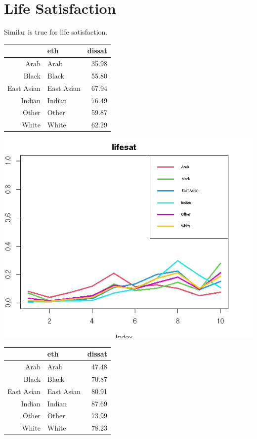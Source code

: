 \documentclass{amsart}
\begin{document}
\section{Life Satisfaction}

Similar is true for life satisfaction.
\begin{table}[ht]
\centering
\begin{tabular}{rlr}
  \hline
 & eth & dissat \\ 
  \hline
Arab & Arab & 35.98 \\ 
  Black & Black & 55.80 \\ 
  East Asian & East Asian & 67.94 \\ 
  Indian & Indian & 76.49 \\ 
  Other & Other & 59.87 \\ 
  White & White & 62.29 \\ 
   \hline
\end{tabular}
\end{table}


\includegraphics[scale=0.6]{lifesat.jpeg}


\begin{table}[ht]
\centering
\begin{tabular}{rlr}
  \hline
 & eth & dissat \\ 
  \hline
Arab & Arab & 47.48 \\ 
  Black & Black & 70.87 \\ 
  East Asian & East Asian & 80.91 \\ 
  Indian & Indian & 87.69 \\ 
  Other & Other & 73.99 \\ 
  White & White & 78.23 \\ 
   \hline
\end{tabular}
\end{table}
\end{document}
